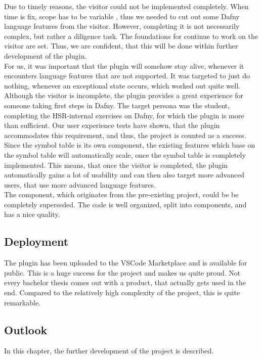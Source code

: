 Due to timely reasons, the visitor could not be implemented completely.
When time is fix, scope has to be variable \cite{keller}, thus we needed to cut out some Dafny language features from the visitor.
However, completing it is not necessarily complex, but rather a diligence task.
The foundations for continue to work on the visitor are set.
Thus, we are confident, that this will be done within further development of the plugin.\\

For us, it was important that the plugin will somehow stay alive, whenever it encounters language features that are not supported.
It was targeted to just do nothing, whenever an exceptional state occurs, which worked out quite well.\\

Although the visitor is incomplete, the plugin provides a great experience for someone taking first steps in Dafny.
The target persona was the student, completing the HSR-internal exercises on Dafny, for which the plugin is more than sufficient.
Our user experience tests have shown, that the plugin accommodates this requirement, and thus, the project is counted as a success.\\

Since the symbol table is its own component, the existing features which base on the symbol table will automatically scale, once the symbol table is completely implemented.
This means, that once the visitor is completed, the plugin automatically gains a lot of usability and can then also target more advanced users, that use more advanced language features.\\

The  component, which originates from the pre-existing project, could be be completely superseded.
The code is well organized, split into components, and has a nice quality.

\subsection{Deployment}
The plugin has been uploaded to the VSCode Marketplace and is available for public.
This is a huge success for the project and makes us quite proud.
Not every bachelor thesis comes out with a product, that actually gets used in the end.
Compared to the relatively high complexity of the project, this is quite remarkable.

\subsection{Outlook}
In this chapter, the further development of the project is described.

